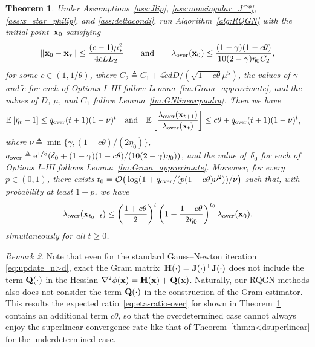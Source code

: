 \documentclass[11pt]{article}
\theoremstyle{plain}
\newtheorem{theorem}{Theorem}
\theoremstyle{definition}
\theoremstyle{remark}
\newtheorem{remark}[theorem]{Remark}
\theoremstyle{plain}
\def\mQ {{\bf Q}}
\def\H{{\bf H}}
\def \J{{\bf J}}
\def\Q{{\bf Q}}
\def\x{{\bf x}}
\def\OM{{\mathcal O}}
\def\EB{{\mathbb E}}
\def \EBP #1{\EB\left[#1\right]}
\begin{document}
\begin{theorem}
\label{thm:two-stage-n>d}
Under Assumptions~\ref{ass:Jlip}, \ref{ass:nonsingular_J^*}, \ref{ass:x_star_philip}, and \ref{ass:deltacondi}, run Algorithm~\ref{alg:RQGN} with the initial point~$\x_0$ satisfying
\begin{align}
\label{eq:inicondi_final_n>d}
\|\x_0-\x_*\|\leq\frac{(c-1)\mu_*^2}{4cLL_2}
\qquad\text{and}\qquad
\lambda_{\mathrm{over}}(\x_0)\leq
\frac{(1-\gamma)(1-c\theta)}{10(2-\gamma)\eta_0C_2},
\end{align}
for some $c\in(1,1/\theta)$, where
$C_2\triangleq C_1+4\tilde{c}dD/(\sqrt{1-c\theta}\mu^5)$,
the values of $\gamma$ and $\tilde{c}$ for each of Options I--III follow Lemma~\ref{lm:Gram_approximate}, 
and the values of $D$, $\mu$, and $C_1$ follow Lemma~\ref{lm:GNlinearquadra}.
Then we have
\begin{align}
\label{eq:eta-ratio-over}
\EBP{\eta_t-1}
&\leq q_{\text{\rm over}}(t+1)(1-\nu)^t
\quad\text{and}\quad
\EBP{\frac{\lambda_{\mathrm{over}}(\x_{t+1})}{\lambda_{\mathrm{over}}(\x_t)}}
\leq c\theta+q_{\text{\rm over}}(t+1)(1-\nu)^t,
\end{align}
where $\nu\triangleq\min\{\gamma,(1-c\theta)/(2\eta_0)\}$,
$q_{\text{\rm over}}\triangleq {\rm e}^{1/5}
(\delta_0+(1-\gamma)(1-c\theta)/(10(2-\gamma)\eta_0))$, and the
value of~$\delta_0$ for each of Options I--III follows
Lemma~\ref{lm:Gram_approximate}.
Moreover, for every $p\in(0,1)$, there exists
$t_0=\OM\big(\log(1+q_{\text{\rm over}}/(p(1-c\theta)\nu^2))/\nu\big)$
such that, with probability at least $1-p$, we have
\begin{align}
\label{eq:n>dtwostage}
\lambda_{\mathrm{over}}(\x_{t_0+t})
\leq\left(\frac{1+c\theta}{2}\right)^t
\left(1-\frac{1-c\theta}{2\eta_0}\right)^{t_0}\lambda_{\mathrm{over}}(\x_0),
\end{align}
simultaneously for all $t\geq0$.
\end{theorem}

\begin{remark}
Note that even for the standard Gauss--Newton iteration \eqref{eq:update_n>d},
exact the Gram matrix~$\H(\cdot)=\J(\cdot)^{\top}\J(\cdot)$ does not include the term $\mQ(\cdot)$ in the Hessian  $\nabla^2\phi(\x)=\H(\x)+\Q(\x)$.
Naturally, our RQGN methods also does not consider the term $\mQ(\cdot)$ in the construction of the Gram estimator.
This results the expected ratio~\eqref{eq:eta-ratio-over} 
for shown in Theorem~\ref{thm:two-stage-n>d} contains an additional term $c\theta$, so that the overdetermined case cannot always enjoy the superlinear convergence rate like that of Theorem~\ref{thm:n<dsuperlinear} for the underdetermined case.
\end{remark}
\end{document}
